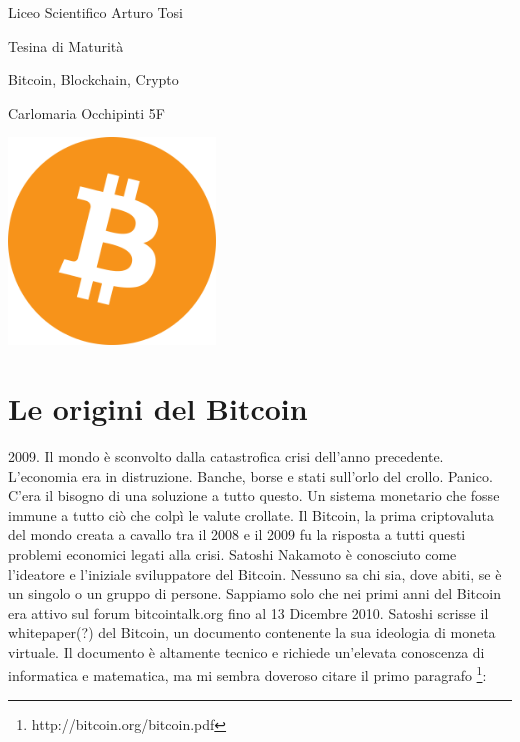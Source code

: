 \documentclass {article}
\begin{document}


\begin {titlepage}

\centering
{\LARGE Liceo Scientifico Arturo Tosi \par}
\vspace{1cm}
{\Large Tesina di Maturità\par}
\vspace{1.5cm}
{\huge Bitcoin, Blockchain, Crypto\par}
\vspace{2cm}
{\Large Carlomaria Occhipinti 5F\par}
\vfill
\includegraphics [width = 5.5cm] {media/logo.png}
\vfill

\end {titlepage}


\newpage

\tableofcontents


\newpage


\section {Le origini del Bitcoin}


2009. Il mondo è sconvolto dalla catastrofica crisi dell'anno precedente.
L'economia era in distruzione. Banche, borse e stati sull'orlo del crollo. Panico.
C'era il bisogno di una soluzione a tutto questo. Un sistema monetario che fosse immune a tutto ciò che colpì le valute crollate. Il Bitcoin, la prima criptovaluta del mondo creata a cavallo tra il 2008 e il 2009 fu la risposta a tutti questi problemi economici legati alla crisi.
Satoshi Nakamoto è conosciuto come l'ideatore e l'iniziale sviluppatore del Bitcoin. Nessuno sa chi sia, dove abiti, se è un singolo o un gruppo di persone. Sappiamo solo che nei primi anni del Bitcoin era attivo sul forum bitcointalk.org fino al 13 Dicembre 2010.
Satoshi scrisse il whitepaper(?) del Bitcoin, un documento contenente la sua ideologia di moneta virtuale. Il documento è altamente tecnico e richiede un'elevata conoscenza di informatica e matematica, ma mi sembra doveroso citare il primo paragrafo \footnote{http://bitcoin.org/bitcoin.pdf}:\\
\end{document}
